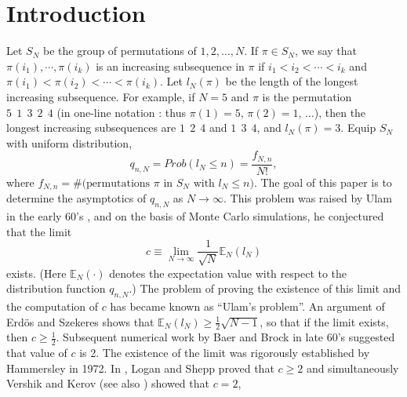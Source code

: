 \documentclass{amsart}
\theoremstyle{definition}
\theoremstyle{remark}
\numberwithin{equation}{section}
\newcommand{\E}{\mathbb E}
\begin{document}
\maketitle







\section{{\bf Introduction}}
\label{s-intro}

Let $S_N$ be the group of permutations of $1,2,\dots,N$.
If $\pi\in S_N$, we say that $\pi(i_1),\cdots,\pi(i_k)$
is an increasing subsequence in $\pi$ if $i_1<i_2< \cdots <i_k$ and
$\pi(i_1) < \pi(i_2) < \cdots < \pi(i_k)$.
Let $l_N(\pi)$ be the length of the longest increasing subsequence.
For example, if $N=5$ and $\pi$ is the permutation 
$5\ \ 1\ \ 3\ \  2\ \ 4$ (in one-line notation 
: thus $\pi(1)=5$, $\pi(2)=1$, $\dots$), then the longest
increasing subsequences are $1\ \ 2\ \ 4$ and $1\ \ 3\ \ 4$, and $l_N(\pi)=3$.
Equip $S_N$ with uniform distribution, 
\begin{equation*}
   q_{n,N}=Prob(l_N\le n)=\frac{f_{N,n}}{N!}, 
\end{equation*}
where $f_{N,n}=\# \text{(permutations $\pi$ in $S_N$ with $l_N\le n$)}$.
The goal of this paper is to determine the asymptotics of 
$q_{n,N}$ as $N\to\infty$.
This problem was raised by Ulam in the early 60's \cite{Ul}, 
and on the basis of Monte Carlo simulations, he 
conjectured that the limit
\begin{equation}
   c\equiv \lim_{N\to\infty} \frac1{\sqrt{N}} \E_N(l_N)
\end{equation}
exists.   
(Here $\E_N(\cdot)$ denotes the expectation value with respect
to the distribution function $q_{n,N}$.)
The problem of proving the existence of this limit and the computation 
of $c$ has became known as ``Ulam's problem''.
An argument of Erd\"os and Szekeres \cite{ES} shows that 
$\E_N(l_N)\geq \frac12\sqrt{N-1}$, so that if the limit 
exists, then $c\geq\frac12$.
Subsequent numerical work by Baer and Brock \cite{BB} 
in late 60's suggested that value of $c$ is 2.
The existence of the limit was rigorously 
established by Hammersley \cite{Ha} in 1972.
In \cite{LS}, Logan and Shepp proved that $c\geq 2$ and simultaneously 
Vershik and Kerov \cite{VK} (see also \cite{VK2}) showed that $c=2$, 
\end{document}
